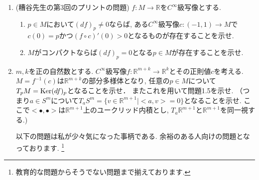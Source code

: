 \documentclass[dvipdfmx,a4paper,11pt]{article}
\newcommand{\R}{\mathbb{R}}
\theoremstyle{definition}
\begin{document}
\begin{enumerate}[label=\textbf{問}2.\arabic*]
\item (糟谷先生の第3回のプリントの問題) $f : M\rightarrow \R$を$C^{\infty}$級写像とする.
\begin{enumerate}
\item $p \in M$において$(df)_{p} \neq 0$ならば, ある$C^{\infty}$級写像$c : (-1,1) \rightarrow M$で$c(0)=p$かつ$(f \circ c)'(0) >0$となるものが存在することを示せ. 
\item $M$がコンパクトならば$(df)_{p} = 0$となる$p \in M$が存在することを示せ. 
\end{enumerate}

\item $m,k$を正の自然数とする. $C^{\infty}$級写像$f : \R^{m+k} \rightarrow \R^{k}$とその正則値$c$を考える. 
$M = f^{-1}(c)$は$\R^{m+k}$の部分多様体となり, 任意の$p \in M$について$T_{p}M = {\rm Ker}(df)_{p}$となることを示せ． またこれを用いて問題1.5を示せ. （つまり$a \in S^{m}$について$T_{a}S^{m} = \{ v \in \R^{m+1} | <a,v> = 0\}$となることを示せ. ここで$<\bullet, \bullet>$は$ \R^{m+1}$上のユークリッド内積とし, $T_{a}\R^{m+1}$と$\R^{m+1}$を同一視する.)

\vspace{11pt}
\hspace{-33pt}{\large $\bullet$発展課題}

\hspace{-22pt}以下の問題は私が少々気になった事柄である. 余裕のある人向けの問題となっております. \footnote{教育的な問題からそうでない問題まで揃えております.}


\end{enumerate}
\end{document}
